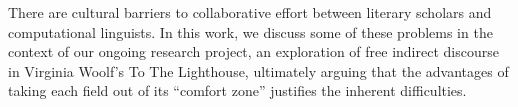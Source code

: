There are cultural barriers to collaborative effort between literary scholars and computational linguists. In this work, we discuss some of these problems in
 the context of our ongoing research project, an exploration of free indirect
 discourse in Virginia Woolf's To The Lighthouse, ultimately arguing that the
 advantages of taking each field out of its ``comfort zone'' justifies the
 inherent
 difficulties.

